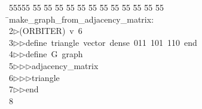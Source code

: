 %
%
\begin{tabbing}
55555 \= 55 \= 55 \= 55 \= 55 \= 55 \= 55 \= 55 \= 55 \= 55 \= 55 \= 55 \= 55 \= \>make\_graph\_from\_adjacency\_matrix:\\[0pt]
2\>$\triangleright$\>(ORBITER)\ v\ 6\ \\[0pt]
3\>$\triangleright$\>$\triangleright$\>define\ triangle\ vector\ dense\ 011\ 101\ 110\ end\ \\[0pt]
4\>$\triangleright$\>$\triangleright$\>define\ G\ graph\ \\[0pt]
5\>$\triangleright$\>$\triangleright$\>$\triangleright$\>adjacency\_matrix\ \\[0pt]
6\>$\triangleright$\>$\triangleright$\>$\triangleright$\>triangle\ \\[0pt]
7\>$\triangleright$\>$\triangleright$\>end\\[0pt]
8\>\end{tabbing}
